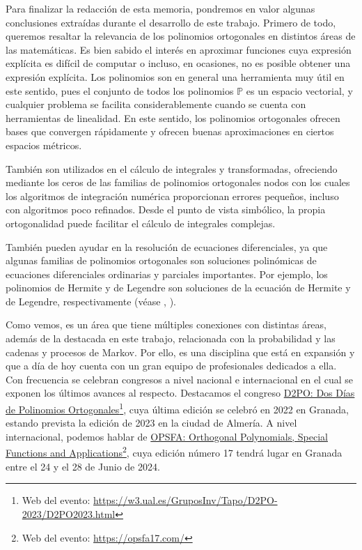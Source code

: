 %
%

Para finalizar la redacción de esta memoria, pondremos en valor algunas conclusiones extraídas durante el desarrollo de este trabajo. Primero de todo, queremos resaltar la relevancia de los polinomios ortogonales en distintos áreas de las matemáticas. Es bien sabido el interés en aproximar funciones cuya expresión explícita es difícil de computar o incluso, en ocasiones, no es posible obtener una expresión explícita. Los polinomios son en general una herramienta muy útil en este sentido, pues el conjunto de todos los polinomios $\mathbb P$ es un espacio vectorial, y cualquier problema se facilita considerablemente cuando se cuenta con herramientas de linealidad. En este sentido, los polinomios ortogonales ofrecen bases que convergen rápidamente y ofrecen buenas aproximaciones en ciertos espacios métricos.

También son utilizados en el cálculo de integrales y transformadas, ofreciendo mediante los ceros de las familias de polinomios ortogonales nodos con los cuales los algoritmos de integración numérica proporcionan errores pequeños, incluso con algoritmos poco refinados. Desde el punto de vista simbólico, la propia ortogonalidad puede facilitar el cálculo de integrales complejas.

También pueden ayudar en la resolución de ecuaciones diferenciales, ya que algunas familias de polinomios ortogonales son soluciones polinómicas de ecuaciones diferenciales ordinarias y parciales importantes. Por ejemplo, los polinomios de Hermite y de Legendre son soluciones de la ecuación de Hermite y de Legendre, respectivamente (véase \cite{Hermite-ed}, \cite{Legendre-ed}).

Como vemos, es un área que tiene múltiples conexiones con distintas áreas, además de la destacada en este trabajo, relacionada con la probabilidad y las cadenas y procesos de Markov. Por ello, es una disciplina que está en expansión y que a día de hoy cuenta con un gran equipo de profesionales dedicados a ella. Con frecuencia se celebran congresos a nivel nacional e internacional en el cual se exponen los últimos avances al respecto. Destacamos el congreso \href{https://w3.ual.es/GruposInv/Tapo/D2PO-2023/D2PO2023.html}{D2PO: Dos Días de Polinomios Ortogonales}\footnote{Web del evento: \url{https://w3.ual.es/GruposInv/Tapo/D2PO-2023/D2PO2023.html}}, cuya última edición se celebró en 2022 en Granada, estando prevista la edición de 2023 en la ciudad de Almería. A nivel internacional, podemos hablar de \href{https://opsfa17.com/}{OPSFA: Orthogonal Polynomials, Special Functions and Applications}\footnote{Web del evento: \url{https://opsfa17.com/}}, cuya edición número 17 tendrá lugar en Granada entre el 24 y el 28 de Junio de 2024.



